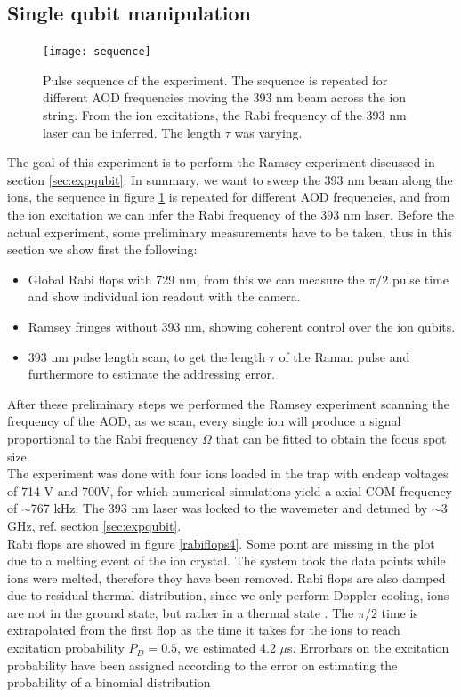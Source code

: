 \subsection{Single qubit manipulation}
\label{sec:singlequbitmanipulation}
\begin{figure}[H]
\centering
\texttt{[image: sequence]}
\caption{Pulse sequence of the experiment. The sequence is repeated for different AOD frequencies moving the 393 nm beam across the ion string. From the ion excitations, the Rabi frequency of the 393 nm laser can be inferred. The length $\tau$ was varying.}
\label{sequence}
\end{figure}
The goal of this experiment is to perform the Ramsey experiment discussed in section \ref{sec:expqubit}. In summary, we want to sweep the 393 nm beam along the ions, the sequence in figure \ref{sequence} is repeated for different AOD frequencies, and from the ion excitation we can infer the Rabi frequency of the 393 nm laser. Before the actual experiment, some preliminary measurements have to be taken, thus in this section we show first the following:
\begin{itemize}
\item Global Rabi flops with 729 nm, from this we can measure the $\pi/2$ pulse time and show individual ion readout with the camera.
\item Ramsey fringes without 393 nm, showing coherent control over the ion qubits.
\item 393 nm pulse length scan, to get the length $\tau$ of the Raman pulse and furthermore to estimate the addressing error.
\end{itemize}
After these preliminary steps we performed the Ramsey experiment scanning the frequency of the AOD, as we scan, every single ion will produce a signal proportional to the Rabi frequency $\Omega$ that can be fitted to obtain the focus spot size.\\
The experiment was done with four ions loaded in the trap with endcap voltages of 714 V and 700V, for which numerical simulations yield a axial COM frequency of $\sim$767 kHz. The 393 nm laser was locked to the wavemeter and detuned by $\sim$3 GHz, ref. section \ref{sec:expqubit}.\\
Rabi flops are showed in figure \ref{rabiflops4}. Some point are missing in the plot due to a melting event of the ion crystal. The system took the data points while ions were melted, therefore they have been removed. Rabi flops are also damped due to residual thermal distribution, since we only perform Doppler cooling, ions are not in the ground state, but rather in a thermal state \cite{ross}. The $\pi/2$ time is extrapolated from the first flop as the time it takes for the ions to reach excitation probability $P_D = 0.5$, we estimated 4.2 $\mu$s. Errorbars on the excitation probability have been assigned according to the error on estimating the probability of a binomial distribution \cite{mle}
